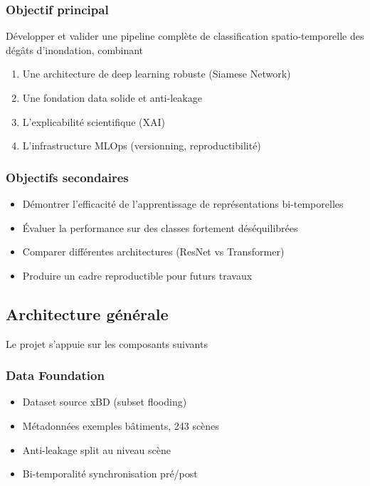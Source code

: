 \documentclass[12pt,a4paper]{article}
\begin{document}
\subsubsection{Objectif principal}
Développer et valider une pipeline complète de classification spatio-temporelle des dégâts d'inondation, combinant\:
\begin{enumerate}
    \item Une architecture de deep learning robuste (Siamese Network)
    \item Une fondation data solide et anti-leakage
    \item L'explicabilité scientifique (XAI)
    \item L'infrastructure MLOps (versionning, reproductibilité)
\end{enumerate}

\subsubsection{Objectifs secondaires}
\begin{itemize}
    \item Démontrer l'efficacité de l'apprentissage de représentations bi-temporelles
    \item Évaluer la performance sur des classes fortement déséquilibrées
    \item Comparer différentes architectures (ResNet vs Transformer)
    \item Produire un cadre reproductible pour futurs travaux
\end{itemize}

\subsection{Architecture générale}
Le projet s'appuie sur les composants suivants\:

\subsubsection{Data Foundation}
\begin{itemize}
    \item Dataset source\: xBD (subset flooding)
    \item Métadonnées exemples bâtiments, 243 scènes
    \item Anti-leakage\: split au niveau scène
    \item Bi-temporalité\: synchronisation pré/post
\end{itemize}
\end{document}
